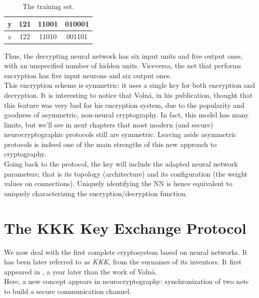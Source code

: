 \documentclass[%
    corpo=11pt,
    twoside,
    stile=classica,
    oldstyle,
    autoretitolo,
    tipotesi=magistrale,
    greek,
    evenboxes,
    english
]{toptesi}
\begin{document}
\begin{table}[]
\begin{tabular}{|c|c|c|c|}
y             & 121                                                           & 11001                                                                        & 010001                                                                       \\ \hline
z             & 122                                                           & 11010                                                                        & 001101                                                                       \\ \hline
\end{tabular}
\caption{The training set.}
\label{table:traingset}
\end{table}
Thus, the decrypting neural network has six input units and five output ones, with an unspecified number of hidden units. Viceversa, the net that performs encryption has five input neurons and six output ones. \\
This encryption scheme is symmetric: it uses a single key for both encryption and decryption. It is interesting to notice that Volná, in his publication, thought that this feature was very bad for his encryption system, due to the popularity and goodness of asymmetric, non-neural cryptography. In fact, this model has many limits, but we'll see in next chapters that most modern (and secure) neurocryptographic protocols still are symmetric. Leaving aside asymmetric protocols is indeed one of the main strengths of this new approach to cryptography. \\
Going back to the protocol, the key will include the adapted neural network parameters; that is its topology (architecture) and its configuration (the weight values on connections). Uniquely identifying the NN is hence equivalent to uniquely characterizing the encryption/decryption function.

\newpage

\section{The KKK Key Exchange Protocol}
We now deal with the first complete cryptosystem based on neural networks. It has been later referred to as \textit{KKK}, from the surnames of its inventors. It first appeared in \cite{kanter}, a year later than the work of Volná. \\
Here, a new concept appears in neurocryptography: synchronization of two nets to build a secure communication channel.
\end{document}
